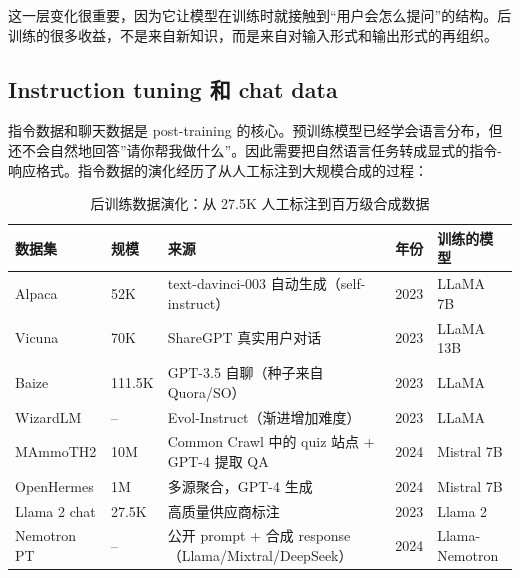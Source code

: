 \documentclass[a4paper]{article}
\begin{document}
这一层变化很重要，因为它让模型在训练时就接触到“用户会怎么提问”的结构。后训练的很多收益，不是来自新知识，而是来自对输入形式和输出形式的再组织。

\subsection{Instruction tuning 和 chat data}

指令数据和聊天数据是 post-training 的核心。预训练模型已经学会语言分布，但还不会自然地回答”请你帮我做什么”。因此需要把自然语言任务转成显式的指令-响应格式。指令数据的演化经历了从人工标注到大规模合成的过程：

\begin{table}[H]
\centering
\small
\begin{tabular}{p{}p{}p{}p{}p{}}
\toprule
\textbf{数据集} & \textbf{规模} & \textbf{来源} & \textbf{年份} & \textbf{训练的模型} \\
\midrule
Alpaca & 52K & text-davinci-003 自动生成（self-instruct） & 2023 & LLaMA 7B \\
Vicuna & 70K & ShareGPT 真实用户对话 & 2023 & LLaMA 13B \\
Baize & 111.5K & GPT-3.5 自聊（种子来自 Quora/SO） & 2023 & LLaMA \\
WizardLM & -- & Evol-Instruct（渐进增加难度） & 2023 & LLaMA \\
MAmmoTH2 & 10M & Common Crawl 中的 quiz 站点 + GPT-4 提取 QA & 2024 & Mistral 7B \\
OpenHermes & 1M & 多源聚合，GPT-4 生成 & 2024 & Mistral 7B \\
Llama 2 chat & 27.5K & 高质量供应商标注 & 2023 & Llama 2 \\
Nemotron PT & -- & 公开 prompt + 合成 response（Llama/Mixtral/DeepSeek） & 2024 & Llama-Nemotron \\
\bottomrule
\end{tabular}
\caption{后训练数据演化：从 27.5K 人工标注到百万级合成数据}
\end{table}
\end{document}
